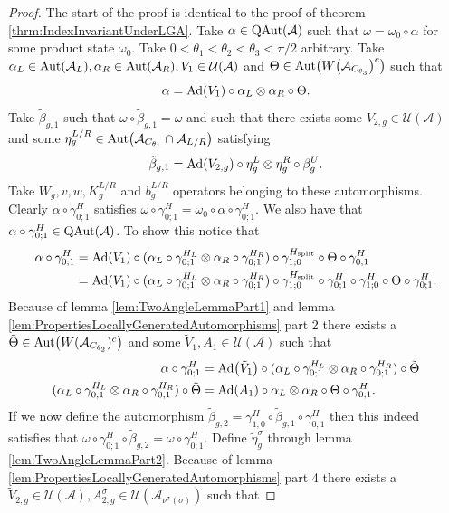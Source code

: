\documentclass[12pt,a4paper,twoside]{article}
\let\originalleft\left
\let\originalright\right
\renewcommand{\left}{\mathopen{}\mathclose\bgroup\originalleft}
\renewcommand{\right}{\aftergroup\egroup\originalright}
\newcommand{\UU}{\mathcal U}
\renewcommand{\AA}{\mathcal A}
\newcommand{\Ad}[1]{\textrm{Ad}\left(#1\right)}
\newcommand{\Aut}[1]{\textrm{Aut}\left(#1\right)}
\newcommand{\QAut}[1]{\textrm{QAut}\left(#1\right)}
\theoremstyle{definition}
\numberwithin{equation}{section}
\begin{document}
\begin{proof}
	The start of the proof is identical to the proof of theorem \ref{thrm:IndexInvariantUnderLGA}. Take $\alpha\in\QAut{\AA}$ such that $\omega=\omega_0\circ\alpha$ for some product state $\omega_0$. Take $0<\theta_1<\theta_2<\theta_3<\pi/2$ arbitrary. Take $\alpha_L\in\Aut{\AA_L},\alpha_R\in\Aut{\AA_R},V_1\in\UU(\AA)$ and $\Theta\in\Aut{W\left(\AA_{C_{\theta_3}}\right)^c}$ such that
	\begin{equation}
		\alpha=\Ad{V_1}\circ\alpha_L\otimes\alpha_R\circ\Theta.
	\end{equation}
	Take $\tilde{\beta}_{g,1}$ such that $\omega\circ\tilde{\beta}_{g,1}=\omega$ and such that there exists some $V_{2,g}\in\UU(\AA)$ and some $\eta_g^{L/R}\in\Aut{\AA_{C_{\theta_1}}\cap\AA_{L/R}}$ satisfying
	\begin{equation}
		\tilde{\beta}_{g,1}=\Ad{V_{2,g}}\circ\eta_{g}^L\otimes\eta_{g}^R\circ\beta_g^U.
	\end{equation}
	Take $W_g,v,w,K_g^{L/R}$ and $b_g^{L/R}$ operators belonging to these automorphisms. Clearly $\alpha\circ\gamma^H_{0;1}$ satisfies $\omega\circ\gamma^{H}_{0;1}=\omega_0\circ\alpha\circ\gamma^{H}_{0;1}$. We also have that $\alpha\circ\gamma^H_{0;1}\in\QAut{\AA}$. To show this notice that
	\begin{align}
		\alpha\circ\gamma^H_{0;1}&=\Ad{V_1}\circ(\alpha_L\circ\gamma^{H_L}_{0;1}\otimes\alpha_R\circ\gamma^{H_R}_{0;1})\circ\gamma^{H_\text{split}}_{1;0}\circ\Theta\circ\gamma^H_{0;1}\\
		&=\Ad{V_1}\circ(\alpha_L\circ\gamma^{H_L}_{0;1}\otimes\alpha_R\circ\gamma^{H_R}_{0;1})\circ\gamma^{H_\text{split}}_{1;0}\circ\gamma^{H}_{0;1}\circ\gamma^{H}_{1;0}\circ\Theta\circ\gamma^H_{0;1}.
	\end{align}
	Because of lemma \ref{lem:TwoAngleLemmaPart1} and lemma \ref{lem:PropertiesLocallyGeneratedAutomorphisms} part 2 there exists a $\tilde{\Theta}\in\Aut{W(\AA_{C_{\theta_2}})^c}$ and some $\tilde V_1,A_1\in\UU(\AA)$ such that
	\begin{align}
		\alpha\circ\gamma^H_{0;1}&=\Ad{\tilde V_1}\circ(\alpha_L\circ\gamma^{H_L}_{0;1}\otimes\alpha_R\circ\gamma^{H_R}_{0;1})\circ\tilde\Theta\\
		(\alpha_L\circ\gamma^{H_L}_{0;1}\otimes\alpha_R\circ\gamma^{H_R}_{0;1})\circ\tilde\Theta&=\Ad{A_1}\circ \alpha_L\otimes\alpha_R\circ\Theta\circ\gamma^{H}_{0;1}.
	\end{align}
	If we now define the automorphism $\tilde{\beta}_{g,2}=\gamma^{H}_{1;0}\circ\tilde\beta_{g,1}\circ\gamma^{H}_{0;1}$ then this indeed satisfies that $\omega\circ\gamma^{H}_{0;1}\circ\tilde{\beta}_{g,2}=\omega\circ\gamma^{H}_{0;1}$. Define $\tilde\eta_g^\sigma$ through lemma \ref{lem:TwoAngleLemmaPart2}. Because of lemma \ref{lem:PropertiesLocallyGeneratedAutomorphisms} part 4 there exists a $\tilde V_{2,g}\in\UU(\AA),A_{2,g}^{\sigma}\in\UU(\AA_{\nu^{\sigma}(\sigma)})$ such that

\end{proof}
\end{document}
